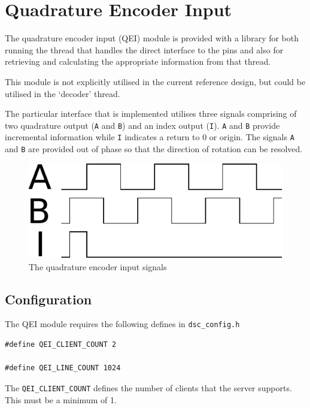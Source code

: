 \section{Quadrature Encoder Input}

The quadrature encoder input (QEI) module is provided with a library for both running the thread that handles the direct interface to the pins and also for retrieving and calculating the appropriate information from that thread. 

This module is not explicitly utilised in the current reference design, but could be utilised in the `decoder' thread.

The particular interface that is implemented utilises three signals comprising of two quadrature output (\verb=A= and \verb=B=) and an index output (\verb=I=). \verb=A= and \verb=B= provide incremental information while \verb=I= indicates a return to 0 or origin. The signals \verb=A= and \verb=B= are provided out of phase so that the direction of rotation can be resolved.

\begin{figure}[h]
\begin{center}
\includegraphics{images/QeiOutput.pdf}
\caption{The quadrature encoder input signals}
\label{fig_QeiInputSignals}
\end{center}
\end{figure}

\subsection{Configuration}

The QEI module requires the following defines in \verb=dsc_config.h=

\begin{lstlisting}
#define QEI_CLIENT_COUNT 2

#define QEI_LINE_COUNT 1024
\end{lstlisting}

The \verb=QEI_CLIENT_COUNT= defines the number of clients that the server supports. This must be a minimum of 1.

